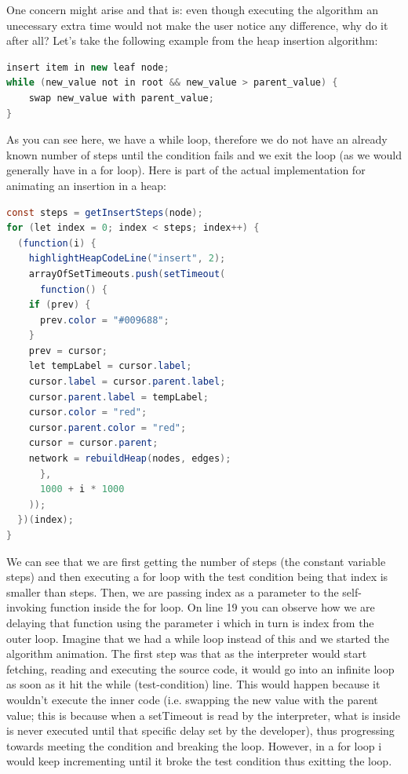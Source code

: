 \documentclass{l4proj}
\begin{document}
One concern might arise and that is: even though executing the algorithm an unecessary extra time would not make the
user notice any difference, why do it after all? Let's take the following example from the heap insertion algorithm:

\begin{lstlisting}[language=Java, caption=Pseudocode for inserting a node in a heap.]
insert item in new leaf node; 
while (new_value not in root && new_value > parent_value) {
    swap new_value with parent_value;
}
\end{lstlisting}

As you can see here, we have a while loop, therefore we do not have an already known number of steps until the
condition fails and we exit the loop (as we would generally have in a for loop). Here is part of the actual implementation for
animating an insertion in a heap:

\begin{lstlisting}[language=Java, caption=Actual implementation for animating the insertion of a heap node.]
const steps = getInsertSteps(node);
for (let index = 0; index < steps; index++) {
  (function(i) {
    highlightHeapCodeLine("insert", 2);
    arrayOfSetTimeouts.push(setTimeout(
      function() {
	if (prev) {
	  prev.color = "#009688";
	}
	prev = cursor;
	let tempLabel = cursor.label;
	cursor.label = cursor.parent.label;
	cursor.parent.label = tempLabel;
	cursor.color = "red";
	cursor.parent.color = "red";
	cursor = cursor.parent;
	network = rebuildHeap(nodes, edges);
      },
      1000 + i * 1000
    ));
  })(index);
}
\end{lstlisting}

We can see that we are first getting the number of steps (the constant variable steps) and then executing a for loop with the test condition being
that index is smaller than steps. Then, we are passing index as a parameter to the self-invoking function inside the
for loop. On line 19 you can observe how we are delaying that function using the parameter i which in turn is index
from the outer loop. Imagine that we had a while loop instead of this and we started the algorithm animation. The first
step was that as the interpreter would start fetching, reading and executing the source code, it would go into an
infinite loop as soon as it hit the while (test-condition) line. This would happen because it wouldn't execute the
inner code (i.e. swapping the new value with the parent value; this is because when a setTimeout is read by the
interpreter, what is
inside is never executed until that specific delay set by the developer), thus progressing towards meeting the condition and
breaking the loop. However, in
a for loop i would keep incrementing until it broke the test condition thus exitting the loop.
\end{document}
